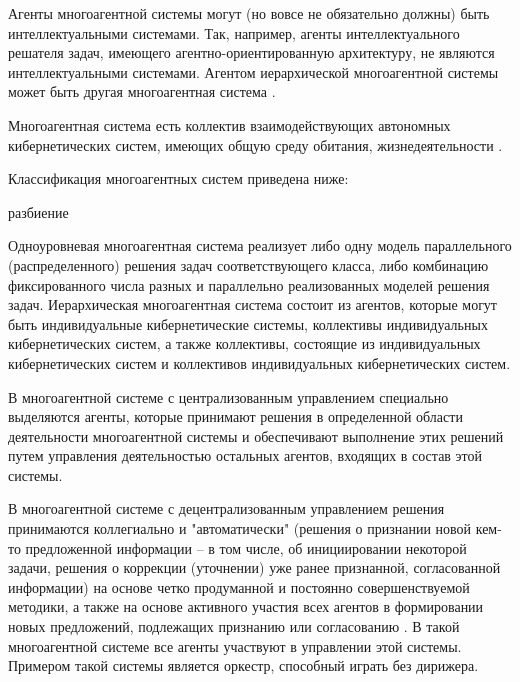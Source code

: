 Агенты многоагентной системы могут (но вовсе не обязательно должны) быть интеллектуальными системами. 
Так, например, агенты интеллектуального решателя задач, имеющего агентно-ориентированную архитектуру, не являются интеллектуальными системами. 
Агентом иерархической многоагентной системы может быть другая многоагентная система .

Многоагентная система есть коллектив взаимодействующих автономных кибернетических систем, имеющих общую среду обитания, жизнедеятельности . 

Классификация многоагентных систем приведена ниже:

\begin{SCn}
\begin{scnrelfromset}{разбиение}
\end{scnrelfromset}
\end{SCn}

Одноуровневая многоагентная система реализует либо одну модель параллельного (распределенного) решения задач соответствующего класса, либо комбинацию фиксированного числа разных и параллельно реализованных моделей решения задач. 
Иерархическая многоагентная система состоит из агентов, которые могут быть индивидуальные кибернетические системы, коллективы индивидуальных кибернетических систем, а также коллективы, состоящие из индивидуальных кибернетических систем и коллективов индивидуальных кибернетических систем.

В многоагентной системе с централизованным управлением специально выделяются агенты, которые принимают решения в определенной области деятельности многоагентной системы и обеспечивают выполнение этих решений путем управления деятельностью остальных агентов, входящих в состав этой системы.

В многоагентной системе с децентрализованным управлением решения принимаются коллегиально и "автоматически"{} (решения о признании новой кем-то предложенной информации – в том числе, об инициировании некоторой задачи, решения о коррекции (уточнении) уже ранее признанной, согласованной информации) на основе четко продуманной и постоянно совершенствуемой методики, а также на основе активного участия всех агентов в формировании новых предложений, подлежащих признанию или согласованию . 
В такой многоагентной системе все агенты участвуют в управлении этой системы. 
Примером такой системы является оркестр, способный играть без дирижера.



